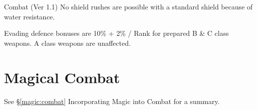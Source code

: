 \begin{Chapter}{Combat (Ver 1.1)}
No shield rushes are possible with a standard shield because of water
resistance.

Evading defence bonuses are 10\% + 2\% / Rank for prepared B \& C
class weapons.  A class weapons are unaffected.

\section{Magical Combat}
\label{combat:magical}

See \S\ref{magic:combat} Incorporating Magic into Combat for a summary.

\end{Chapter}
